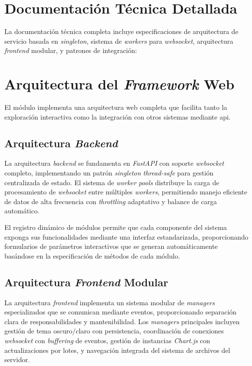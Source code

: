 \section{Documentación Técnica Detallada}
\label{sec:doc_tecnica_api_explorer}

La documentación técnica completa incluye especificaciones de arquitectura de servicio basada en \textit{singleton}, sistema de \textit{\glspl{worker}} para \textit{\gls{websocket}}, arquitectura \textit{frontend} modular, y patrones de integración:



\section{Arquitectura del \textit{Framework} Web}
\label{sec:arquitectura_framework}

El módulo implementa una arquitectura web completa que facilita tanto la exploración interactiva como la integración con otros sistemas mediante \acrshort{api}.

\subsection{Arquitectura \textit{Backend}}
\label{subsec:arquitectura_backend}

La arquitectura \textit{backend} se fundamenta en \textit{FastAPI} con soporte \textit{\gls{websocket}} completo, implementando un patrón \textit{singleton} \textit{\gls{thread-safe}} para gestión centralizada de estado. El sistema de \textit{\gls{worker}} \textit{pools} distribuye la carga de procesamiento de \textit{\gls{websocket}} entre múltiples \textit{\glspl{worker}}, permitiendo manejo eficiente de datos de alta frecuencia con \textit{\gls{throttling}} adaptativo y balance de carga automático.

El registro dinámico de módulos permite que cada componente del sistema exponga sus funcionalidades mediante una interfaz estandarizada, proporcionando formularios de parámetros interactivos que se generan automáticamente basándose en la especificación de métodos de cada módulo.

\subsection{Arquitectura \textit{Frontend} Modular}
\label{subsec:arquitectura_frontend}

La arquitectura \textit{frontend} implementa un sistema modular de \textit{\gls{managers}} especializados que se comunican mediante eventos, proporcionando separación clara de responsabilidades y mantenibilidad. Los \textit{\gls{managers}} principales incluyen gestión de tema oscuro/claro con persistencia, coordinación de conexiones \textit{\gls{websocket}} con \textit{buffering} de eventos, gestión de instancias \textit{Chart.js} con actualizaciones por lotes, y navegación integrada del sistema de archivos del servidor.

